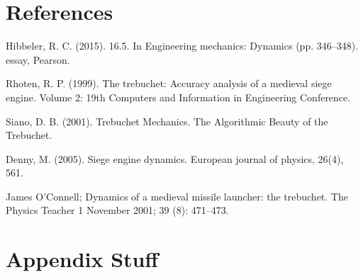 \documentclass[12pt, titlepage]{article}
\begin{document}
    \section{References}
        \hspace{15pt}Hibbeler, R. C. (2015). 16.5. In Engineering mechanics: Dynamics (pp. 346–348). essay, Pearson.

        Rhoten, R. P. (1999). The trebuchet: Accuracy analysis of a medieval siege engine. Volume 2: 19th Computers and Information in Engineering Conference.

        Siano, D. B. (2001). Trebuchet Mechanics. The Algorithmic Beauty of the Trebuchet.

        Denny, M. (2005). Siege engine dynamics. European journal of physics, 26(4), 561.

        James O'Connell; Dynamics of a medieval missile launcher: the trebuchet. The Physics
        Teacher 1 November 2001; 39 (8): 471–473.
    \newpage

    \appendix
    \section{Appendix Stuff}
\end{document}

